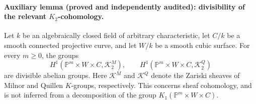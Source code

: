 \paragraph{Auxiliary lemma (proved and independently audited):
divisibility of the relevant $K_2$-cohomology.}
Let $k$ be an algebraically closed field of arbitrary characteristic,
let $C/k$ be a smooth connected projective curve, and let $W/k$ be a
smooth cubic surface. For every $m\geq0$, the groups
\[
 H^1(\mathbb P^m\times W\times C,\mathcal K^M_2),
 \qquad
 H^1(\mathbb P^m\times W\times C,\mathcal K^Q_2)
\]
are divisible abelian groups. Here $\mathcal K^M$ and $\mathcal K^Q$
denote the Zariski sheaves of Milnor and Quillen $K$-groups,
respectively. This concerns sheaf cohomology, and is not inferred from
a decomposition of the group $K_1(\mathbb P^m\times W\times C)$.


